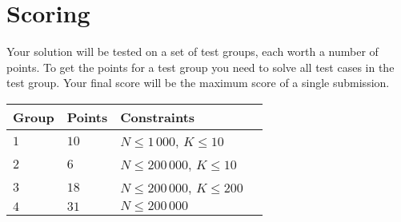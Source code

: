 \section*{Scoring}
Your solution will be tested on a set of test groups, each worth a number of points.
To get the points for a test group you need to solve all test cases in the test group.
Your final score will be the maximum score of a single submission.

\noindent
\begin{tabular}{| l | l | l | l |}
\hline
Group & Points & Constraints \\ \hline
$1$   & $10$   & $N \le 1\,000$, $K \le 10$ \\ \hline
$2$   & $6$    & $N \le 200\,000$, $K \le 10$ \\ \hline
$3$   & $18$   & $N \le 200\,000$, $K \le 200$ \\ \hline
$4$   & $31$   & $N \le 200\,000$ \\ \hline
\end{tabular}

